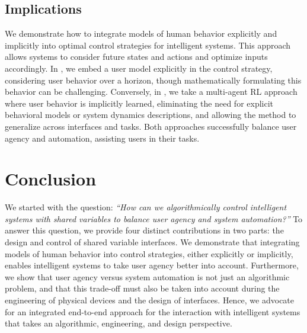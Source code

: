 \subsection*{Implications}
We demonstrate how to integrate models of human behavior explicitly and implicitly into optimal control strategies for intelligent systems. This approach allows systems to consider future states and actions and optimize inputs accordingly. In \magpen, we embed a user model explicitly in the control strategy, considering user behavior over a horizon, though mathematically formulating this behavior can be challenging. Conversely, in \marlui, we take a multi-agent RL approach where user behavior is implicitly learned, eliminating the need for explicit behavioral models or system dynamics descriptions, and allowing the method to generalize across interfaces and tasks. Both approaches successfully balance user agency and automation, assisting users in their tasks.

\section*{Conclusion}
We started with the question: \emph{``How can we algorithmically control intelligent systems with shared variables to balance user agency and system automation?''} To answer this question, we provide four distinct contributions in two parts: the design and control of shared variable interfaces. We demonstrate that integrating models of human behavior into control strategies, either explicitly or implicitly, enables intelligent systems to take user agency better into account. Furthermore, we show that user agency versus system automation is not just an algorithmic problem, and that this trade-off must also be taken into account during the engineering of physical devices and the design of interfaces. Hence, we advocate for an integrated end-to-end approach for the interaction with intelligent systems that takes an algorithmic, engineering, and design perspective.